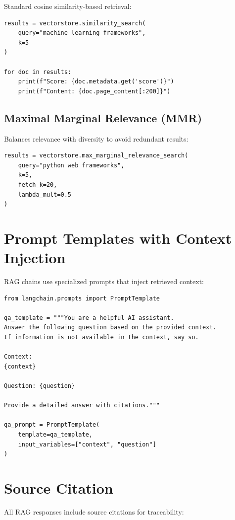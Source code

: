 \documentclass{report}
\begin{document}
Standard cosine similarity-based retrieval:

\begin{lstlisting}
results = vectorstore.similarity_search(
    query="machine learning frameworks",
    k=5
)

for doc in results:
    print(f"Score: {doc.metadata.get('score')}")
    print(f"Content: {doc.page_content[:200]}")
\end{lstlisting}

\subsection{Maximal Marginal Relevance (MMR)}

Balances relevance with diversity to avoid redundant results:

\begin{lstlisting}
results = vectorstore.max_marginal_relevance_search(
    query="python web frameworks",
    k=5,
    fetch_k=20,
    lambda_mult=0.5
)
\end{lstlisting}

\section{Prompt Templates with Context Injection}

RAG chains use specialized prompts that inject retrieved context:

\begin{lstlisting}
from langchain.prompts import PromptTemplate

qa_template = """You are a helpful AI assistant.
Answer the following question based on the provided context.
If information is not available in the context, say so.

Context:
{context}

Question: {question}

Provide a detailed answer with citations."""

qa_prompt = PromptTemplate(
    template=qa_template,
    input_variables=["context", "question"]
)
\end{lstlisting}

\section{Source Citation}

All RAG responses include source citations for traceability:
\end{document}
